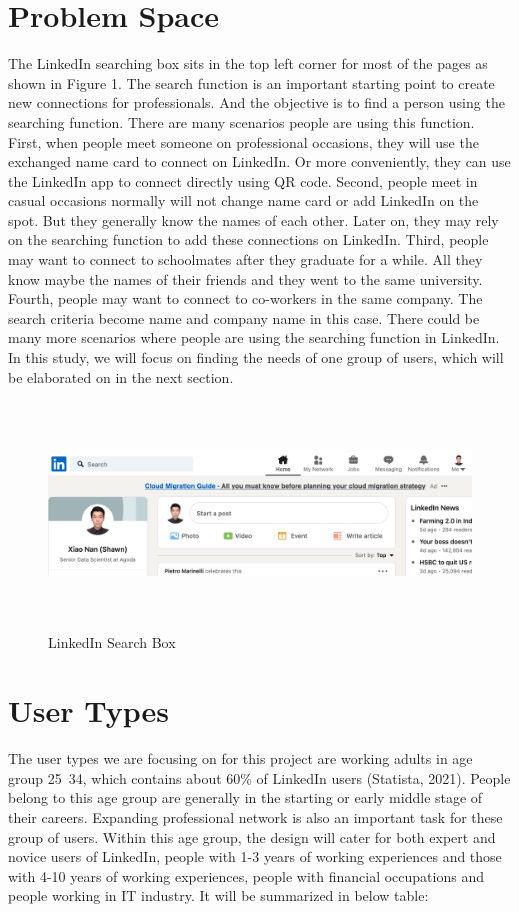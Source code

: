 \documentclass[
	letterpaper, %
]{jdf}
\begin{document}
\section{Problem Space}
The LinkedIn searching box sits in the top left corner for most of the pages as shown in Figure 1. The search function is an important starting point to create new connections for professionals. And the objective is to find a person using the searching function. There are many scenarios people are using this function. First, when people meet someone on professional occasions, they will use the exchanged name card to connect on LinkedIn. Or more conveniently, they can use the LinkedIn app to connect directly using QR code. Second, people meet in casual occasions normally will not change name card or add LinkedIn on the spot. But they generally know the names of each other. Later on, they may rely on the searching function to add these connections on LinkedIn. Third, people may want to connect to schoolmates after they graduate for a while. All they know maybe the names of their friends and they went to the same university. Fourth, people may want to connect to co-workers in the same company. The search criteria become name and company name in this case. There could be many more scenarios where people are using the searching function in LinkedIn. In this study, we will focus on finding the needs of one group of users, which will be elaborated on in the next section.
\begin{figure}[h]
	\centering
	\includegraphics[height=6cm]{Figures/search_box.png}
	\caption{LinkedIn Search Box}
	\label{fig:search_box}
\end{figure}

\section{User Types}
The user types we are focusing on for this project are working adults in age group 25~34, which contains about 60\% of LinkedIn users (Statista, 2021). People belong to this age group are generally in the starting or early middle stage of their careers. Expanding professional network is also an important task for these group of users. Within this age group, the design will cater for both expert and novice users of LinkedIn, people with 1-3 years of working experiences and those with 4-10 years of working experiences, people with financial occupations and people working in IT industry. It will be summarized in below table:
\end{document}
